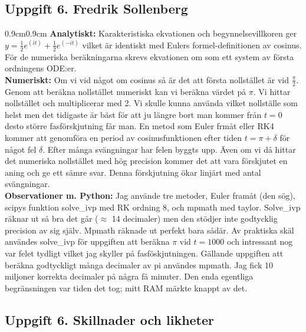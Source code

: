 \documentclass{article}
\begin{document}
\subsection*{Uppgift 6. Fredrik Sollenberg}
\begin{adjustwidth}{0.9cm}{0.9cm}
\textbf{Analytiskt:} Karakteristiska ekvationen och begynnelsevillkoren ger $y=\frac{1}{2} e^{(it)}+ \frac{1}{2} e^{(-it)}$ vilket är identiskt med Eulers formel-definitionen av cosinus. För de numeriska beräkningarna skrevs ekvationen om som ett system av första ordningens ODE:er. 
\medskip\\
\textbf{Numeriskt:}  Om vi vid något om cosinus så är det att första nollstället är vid $\frac{\pi}{2}$. Genom att beräkna nollstället numeriskt kan vi beräkna värdet på $\pi$. Vi hittar nollstället och multiplicerar med 2. Vi skulle kunna använda vilket nollställe som helst men det tidigaste är bäst för att ju längre bort man kommer från $t=0$ desto större fasförskjutning får man. En metod som Euler frmåt eller RK4 kommer att genomföra en period av cosinusfunktionen efter tiden $t=\pi+\delta$ för något fel $\delta$. Efter många svängningar har felen byggts upp. Även om vi då hittar det numeriska nollstället med hög precision kommer det att vara förskjutet en aning och ge ett sämre svar. Denna förskjutning ökar linjärt med antal svängningar.
\medskip\\
\textbf{Observationer m. Python:} Jag använde tre metoder, Euler framåt (den sög), scipys funktion solve\_ivp med RK ordning 8, och mpmath med taylor. Solve\_ivp räknar ut så bra det går ($\approx$ 14 decimaler) men den stödjer inte godtycklig precision av sig själv. Mpmath räknade ut perfekt bara sådär. Av praktiska skäl användes solve\_ivp för uppgiften att beräkna $\pi$ vid $t=1000$ och intressant nog var felet tydligt vilket jag skyller på fasföskjutningen. Gällande uppgiften att beräkna godtyckligt många decimaler av pi användes mpmath. Jag fick 10 miljoner korrekta decimaler på några få minuter. Den enda egentliga begränsningen var tiden det tog; mitt RAM märkte knappt av det. 
\end{adjustwidth}
\subsection*{Uppgift 6. Skillnader och likheter}
\end{document}
